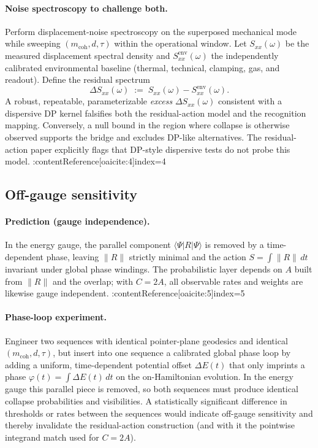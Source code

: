 \documentclass[11pt,letterpaper]{article}
\begin{document}
\paragraph{Noise spectroscopy to challenge both.}
Perform displacement-noise spectroscopy on the superposed mechanical mode while sweeping $(m_{\mathrm{coh}}, d, \tau)$ within the operational window. Let $S_{xx}(\omega)$ be the measured displacement spectral density and $S_{xx}^{\mathrm{env}}(\omega)$ the independently calibrated environmental baseline (thermal, technical, clamping, gas, and readout). Define the residual spectrum
\begin{equation}
\Delta S_{xx}(\omega)\;:=\;S_{xx}(\omega)-S_{xx}^{\mathrm{env}}(\omega).
\end{equation}
A robust, repeatable, parameterizable \emph{excess} $\Delta S_{xx}(\omega)$ consistent with a dispersive DP kernel falsifies both the residual-action model and the recognition mapping. Conversely, a null bound in the region where collapse is otherwise observed supports the bridge and excludes DP-like alternatives. The residual-action paper explicitly flags that DP-style dispersive tests do not probe this model. :contentReference[oaicite:4]{index=4}

\subsection{Off-gauge sensitivity}

\paragraph{Prediction (gauge independence).}
In the energy gauge, the parallel component $\langle\Psi|R|\Psi\rangle$ is removed by a time-dependent phase, leaving $\|R\|$ strictly minimal and the action $S=\int\!\|R\|\,dt$ invariant under global phase windings. The probabilistic layer depends on $A$ built from $\|R\|$ and the overlap; with $C=2A$, all observable rates and weights are likewise gauge independent. :contentReference[oaicite:5]{index=5}

\paragraph{Phase-loop experiment.}
Engineer two sequences with identical pointer-plane geodesics and identical $(m_{\mathrm{coh}}, d, \tau)$, but insert into one sequence a calibrated global phase loop by adding a uniform, time-dependent potential offset $\Delta E(t)$ that only imprints a phase $\varphi(t)=\int\!\Delta E(t)\,dt$ on the on-Hamiltonian evolution. In the energy gauge this parallel piece is removed, so both sequences must produce identical collapse probabilities and visibilities. A statistically significant difference in thresholds or rates between the sequences would indicate off-gauge sensitivity and thereby invalidate the residual-action construction (and with it the pointwise integrand match used for $C=2A$).
\end{document}
